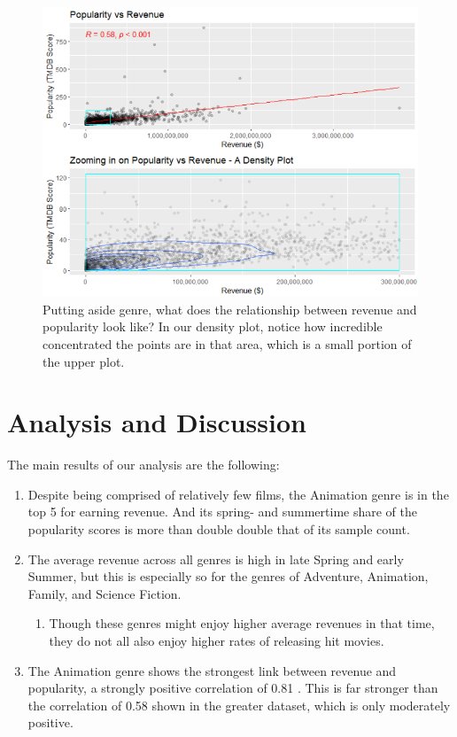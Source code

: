 \documentclass[12pt]{article}
\begin{document}
\begin{figure}[H]
    \centering
    \includegraphics[width=1\textwidth]{images/overall rev and pop and with density.png}
    \caption{Putting aside genre, what does the relationship between revenue and popularity look like? In our density plot, notice how incredible concentrated the points are in that area, which is a small portion of the upper plot.}
    \label{fig:figure_7}
\end{figure}

\section{Analysis and Discussion}

The main results of our analysis are the following:

\begin{enumerate}
    \item Despite being comprised of relatively few films, the Animation genre is in the top 5 for earning revenue. And its spring- and summertime share of the popularity scores is more than double double that of its sample count.
    \item The average revenue across all genres is high in late Spring and early Summer, but this is especially so for the genres of Adventure, Animation, Family, and Science Fiction.
    \begin{enumerate}
        \item Though these genres might enjoy higher average revenues in that time, they do not all also enjoy higher rates of releasing hit movies.
    \end{enumerate}
    \item The Animation genre shows the strongest link between revenue and popularity, a strongly positive correlation of 0.81 . This is far stronger than the correlation of 0.58 shown in the greater dataset, which is only moderately positive.
\end{enumerate}
\end{document}

